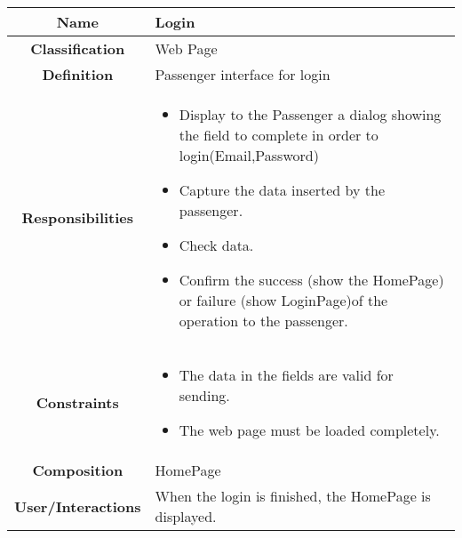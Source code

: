 \documentclass[11pt, a4paper,titlepage]{article}
\begin{document}
\begin{enumerate}
\begin{tabularx}{\textwidth}{| c | X |}
		\hline
		\textbf{Name} & 
		Login
		\\
		\hline
		\textbf{Classification} & 
		Web Page
		\\
		\hline
		\textbf{Definition} & 
		Passenger interface for login
		\\
		\hline
		\textbf{Responsibilities} &
		\begin{itemize}
			\item Display to the Passenger a dialog showing the field to complete in order to login(Email,Password)
			\item Capture the data inserted by the passenger.
			\item Check data.
			\item Confirm the success (show the HomePage) or failure (show LoginPage)of the operation to the passenger.
		\end{itemize}
		\\
		\hline
		\textbf{Constraints} & 
		\begin{itemize}
			\item  The data in the fields are valid for sending.
			\item The web page must be loaded completely.
		\end{itemize}
		\\
		\hline
		\textbf{Composition} & 
		HomePage
		\\
		\hline
		\textbf{User/Interactions} & 
	When the login is finished, the HomePage is displayed.
		\\
		\hline	
	\end{tabularx}


\end{enumerate}
\end{document}
